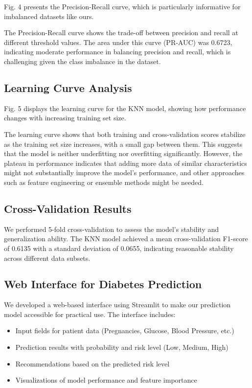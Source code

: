 \documentclass[conference]{IEEEtran}
\begin{document}
Fig. 4 presents the Precision-Recall curve, which is particularly informative for imbalanced datasets like ours.

The Precision-Recall curve shows the trade-off between precision and recall at different threshold values. The area under this curve (PR-AUC) was 0.6723, indicating moderate performance in balancing precision and recall, which is challenging given the class imbalance in the dataset.

\subsection{Learning Curve Analysis}
Fig. 5 displays the learning curve for the KNN model, showing how performance changes with increasing training set size.

The learning curve shows that both training and cross-validation scores stabilize as the training set size increases, with a small gap between them. This suggests that the model is neither underfitting nor overfitting significantly. However, the plateau in performance indicates that adding more data of similar characteristics might not substantially improve the model's performance, and other approaches such as feature engineering or ensemble methods might be needed.

\subsection{Cross-Validation Results}
We performed 5-fold cross-validation to assess the model's stability and generalization ability. The KNN model achieved a mean cross-validation F1-score of 0.6135 with a standard deviation of 0.0655, indicating reasonable stability across different data subsets.

\subsection{Web Interface for Diabetes Prediction}
We developed a web-based interface using Streamlit to make our prediction model accessible for practical use. The interface includes:

\begin{itemize}
    \item Input fields for patient data (Pregnancies, Glucose, Blood Pressure, etc.)
    \item Prediction results with probability and risk level (Low, Medium, High)
    \item Recommendations based on the predicted risk level
    \item Visualizations of model performance and feature importance
\end{itemize}
\end{document}
